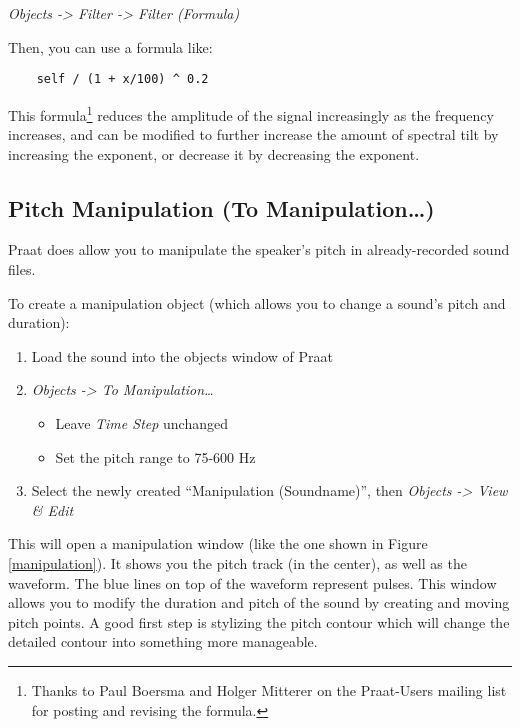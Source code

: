 \emph{Objects -\textgreater{} Filter -\textgreater{} Filter (Formula)}

Then, you can use a formula like:

\begin{verbatim}
    self / (1 + x/100) ^ 0.2
\end{verbatim}

This
formula\footnote{Thanks to Paul Boersma and Holger Mitterer on the Praat-Users mailing list for posting and revising the formula.}
reduces the amplitude of the signal increasingly as the frequency
increases, and can be modified to further increase the amount of
spectral tilt by increasing the exponent, or decrease it by decreasing
the exponent.

\hypertarget{pitch-manipulation-to-manipulation}{%
\subsection{Pitch Manipulation (To
Manipulation\ldots)}\label{pitch-manipulation-to-manipulation}}

Praat does allow you to manipulate the speaker's pitch in
already-recorded sound files.

To create a manipulation object (which allows you to change a sound's
pitch and duration):

\begin{enumerate}
\def\labelenumi{\arabic{enumi}.}
\tightlist
\item
  Load the sound into the objects window of Praat
\item
  \emph{Objects -\textgreater{} To Manipulation\ldots{}}

  \begin{itemize}
  \tightlist
  \item
    Leave \emph{Time Step} unchanged
  \item
    Set the pitch range to 75-600 Hz
  \end{itemize}
\item
  Select the newly created ``Manipulation (Soundname)'', then
  \emph{Objects -\textgreater{} View \& Edit}
\end{enumerate}

This will open a manipulation window (like the one shown in Figure
\ref{manipulation}). It shows you the pitch track (in the center), as
well as the waveform. The blue lines on top of the waveform represent
pulses. This window allows you to modify the duration and pitch of the
sound by creating and moving pitch points. A good first step is
stylizing the pitch contour which will change the detailed contour into
something more manageable.

